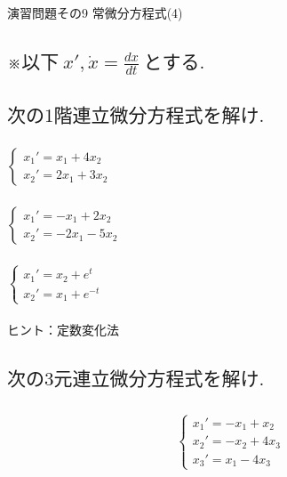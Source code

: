 \documentclass[a4paper,11pt,fleqn]{jarticle}
\begin{document}
\begin{center}
\begin{Large}
演習問題その9  常微分方程式(4)
\end{Large}
\end{center}

\subsection*{$※以下~x',\dot{x}=\frac{dx}{dt}~とする.$}
\subsection{$次の1階連立微分方程式を解け.$}
\subsubsection{}
$\left\{ \begin{array}{l}
x_1'=x_1+4x_2 \\
x_2'=2x_1+3x_2
\end{array} \right.$

\newpage
\subsubsection{}
$\left\{ \begin{array}{l}
x_1'=-x_1+2x_2 \\
x_2'=-2x_1-5x_2
\end{array} \right.$

\newpage
\subsubsection{}
$\left\{ \begin{array}{l}
x_1'=x_2+e^t \\
x_2'=x_1+e^{-t}
\end{array} \right.$
\\
\\
ヒント：定数変化法

\newpage
\subsection{$次の3元連立微分方程式を解け.$}
\subsubsection{}
\begin{eqnarray*}
\left\{ \begin{array}{l}
x_{1}'=-x_{1}+x_{2}  \\
x_{2}'=-x_{2}+4x_{3} \\
x_{3}'=x_{1}-4x_{3}  
\end{array}\right.
\end{eqnarray*}
\end{document}
